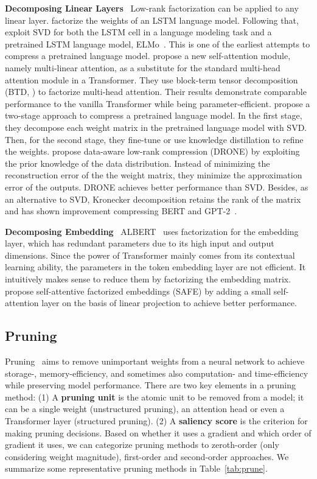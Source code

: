 \documentclass[letterpaper]{article}
\newcommand{\paratitle}[1]{\noindent\textbf{#1}\ }
\begin{document}
\paratitle{Decomposing Linear Layers} Low-rank factorization can be applied to any linear layer. \citet{grachev2017neural} factorize the weights of an LSTM language model. Following that, \citet{winata2019effectiveness} exploit SVD for both the LSTM cell in a language modeling task and a pretrained LSTM language model, ELMo~\citep{elmo}. This is one of the earliest attempts to compress a pretrained language model. \citet{ma2019tensorized} propose a new self-attention module, namely multi-linear attention, as a substitute for the standard multi-head attention module in a Transformer. They use block-term tensor decomposition (BTD, \citealp{btd}) to factorize multi-head attention. Their results demonstrate comparable performance to the vanilla Transformer while being parameter-efficient. \citet{noach2020compressing} propose a two-stage approach to compress a pretrained language model. In the first stage, they decompose each weight matrix in the pretrained language model with SVD. Then, for the second stage, they fine-tune or use knowledge distillation to refine the weights. \citet{chen2021drone} propose data-aware low-rank compression (DRONE) by exploiting the prior knowledge of the data distribution. Instead of minimizing the reconstruction error of the the weight matrix, they minimize the approximation error of the outputs. DRONE achieves better performance than SVD. Besides, as an alternative to SVD, Kronecker decomposition retains the rank of the matrix and has shown improvement compressing BERT and GPT-2~\citep{tahaei2021kroneckerbert,kroneckergpt}.

\paratitle{Decomposing Embedding} ALBERT~\citep{albert} uses factorization for the embedding layer, which has redundant parameters due to its high input and output dimensions.
Since the power of Transformer mainly comes from its contextual learning ability, the parameters in the token embedding layer are not efficient. It intuitively makes sense to reduce them by factorizing the embedding matrix. \citet{reid2021subformer} propose self-attentive factorized embeddings (SAFE) by adding a small self-attention layer on the basis of linear projection to achieve better performance.

\subsection{Pruning}
\label{sec:pruning}

Pruning~\citep{obd} aims to remove unimportant weights from a neural network to achieve storage-, memory-efficiency, and sometimes also computation- and time-efficiency while preserving model performance. There are two key elements in a pruning method: (1) A \textbf{pruning unit} is the atomic unit to be removed from a model; it can be a single weight (unstructured pruning), an attention head or even a Transformer layer (structured pruning). (2) A \textbf{saliency score} is the criterion for making pruning decisions. Based on whether it uses a gradient and which order of gradient it uses, we can categorize pruning methods to zeroth-order (only considering weight magnitude), first-order and second-order approaches. We summarize some representative pruning methods in Table~\ref{tab:prune}.
\end{document}
